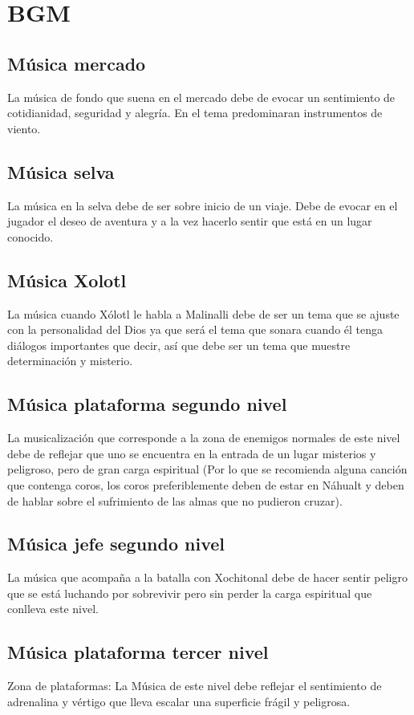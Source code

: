\section{BGM}
\subsection{Música  mercado}\label{Musica:N01_ZN01}
La música de fondo que suena en el mercado debe de evocar un sentimiento de cotidianidad, seguridad y alegría. En el tema predominaran instrumentos de viento. 		
\subsection{Música  selva}\label{Musica:N01_ZN02}
La música en la selva debe de ser sobre inicio de un viaje. Debe de evocar en el jugador el deseo de aventura y a la vez hacerlo sentir que está en un lugar conocido.
\subsection{Música  Xolotl} \label{Musica:Xolotl}
La música cuando Xólotl le habla a Malinalli debe de ser un tema que se ajuste con la personalidad del Dios ya que será el tema que sonara cuando él tenga diálogos importantes que decir, así que debe ser un tema que muestre determinación y misterio.
\subsection{Música plataforma segundo nivel}\label{Musica:N02_ZN01}
La musicalización que corresponde a la zona de enemigos normales de este nivel debe de reflejar que uno se encuentra en la entrada de un lugar misterios y peligroso, pero de gran carga espiritual (Por lo que se recomienda alguna canción que contenga coros, los coros preferiblemente deben de estar en Náhualt y deben de hablar sobre el sufrimiento de las almas que no pudieron cruzar).
\subsection{Música jefe segundo nivel}\label{Musica:N02_ZN02}
La música que acompaña a la batalla con Xochitonal debe de hacer sentir peligro que se está luchando por sobrevivir pero sin perder la carga espiritual que conlleva este nivel. 
\subsection{Música plataforma tercer nivel} \label{Musica:N03_ZN01}
Zona de plataformas: La Música  de este nivel debe reflejar el sentimiento de adrenalina y vértigo que lleva escalar una superficie frágil y peligrosa.
